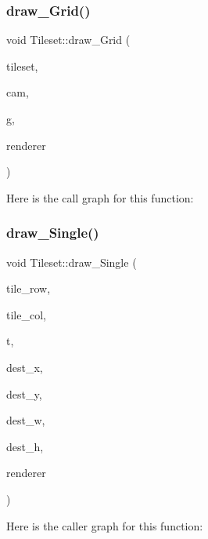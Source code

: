 \subsubsection{\texorpdfstring{draw\+\_\+\+Grid()}{draw\_Grid()}}
{\footnotesize\ttfamily void Tileset\+::draw\+\_\+\+Grid (\begin{DoxyParamCaption}\item[{const \mbox{\hyperlink{struct_tileset_1_1_tileset}{Tileset}} $\ast$}]{tileset,  }\item[{const \mbox{\hyperlink{struct_grid___camera_1_1_grid___camera}{Grid\+\_\+\+Camera\+::\+Grid\+\_\+\+Camera}} $\ast$}]{cam,  }\item[{const \mbox{\hyperlink{struct_grid_1_1_grid}{Grid\+::\+Grid}} $\ast$}]{g,  }\item[{S\+D\+L\+\_\+\+Renderer $\ast$}]{renderer }\end{DoxyParamCaption})}

Here is the call graph for this function\+:
\mbox{\label{namespace_tileset_acbff0eb5232585b9d7f9c82249c1312b}} 
\subsubsection{\texorpdfstring{draw\+\_\+\+Single()}{draw\_Single()}}
{\footnotesize\ttfamily void Tileset\+::draw\+\_\+\+Single (\begin{DoxyParamCaption}\item[{int}]{tile\+\_\+row,  }\item[{int}]{tile\+\_\+col,  }\item[{const \mbox{\hyperlink{struct_tileset_1_1_tileset}{Tileset}} $\ast$}]{t,  }\item[{int}]{dest\+\_\+x,  }\item[{int}]{dest\+\_\+y,  }\item[{int}]{dest\+\_\+w,  }\item[{int}]{dest\+\_\+h,  }\item[{const S\+D\+L\+\_\+\+Renderer $\ast$}]{renderer }\end{DoxyParamCaption})}

Here is the caller graph for this function\+:
\mbox{\label{namespace_tileset_a4daa4d4b2aa9fc60b65c1735bd7b6323}} 

